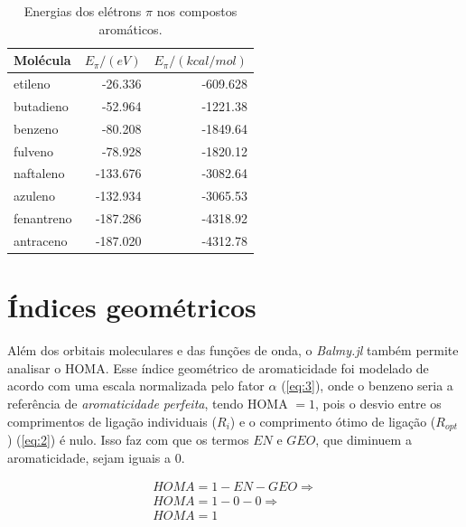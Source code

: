 \begin{table}[htb]
	\centering
	\caption{\label{tab:energies} Energias dos elétrons $\pi$ nos compostos aromáticos.}	
	\begin{tabular}{lrr}
		\toprule
		\textbf{Molécula} & $E_\pi / (eV)$ & $E_\pi / (kcal/mol)$
		\\ 
		\midrule
        etileno & -26.336 & -609.628 \\
        butadieno & -52.964 & -1221.38 \\
        benzeno & -80.208 & -1849.64 \\
        fulveno & -78.928 & -1820.12 \\
        naftaleno & -133.676 & -3082.64 \\
        azuleno & -132.934 & -3065.53 \\
        fenantreno & -187.286 & -4318.92 \\
        antraceno & -187.020 & -4312.78 \\
    \bottomrule
	\end{tabular}
\end{table}

\newpage

\section{Índices geométricos}

Além dos orbitais moleculares e das funções de onda, o \textit{Balmy.jl} também permite analisar o \gls{HOMA}. Esse índice geométrico de aromaticidade foi modelado de acordo com uma escala normalizada pelo fator $\alpha$ (\autoref{eq:3}), onde o benzeno seria a referência de \textit{aromaticidade perfeita}, tendo \gls{HOMA} $=1$, pois o desvio entre os comprimentos de ligação individuais ($R_i$) e o comprimento ótimo de ligação ($R_{opt}$) (\autoref{eq:2}) é nulo. Isso faz com que os termos $EN$ e $GEO$, que diminuem a aromaticidade, sejam iguais a $0$.

\begin{equation}
\begin{split}
    HOMA = 1 - EN - GEO \Longrightarrow \\  HOMA = 1 - 0 - 0 \Longrightarrow \\  HOMA = 1
\end{split}
\end{equation}

